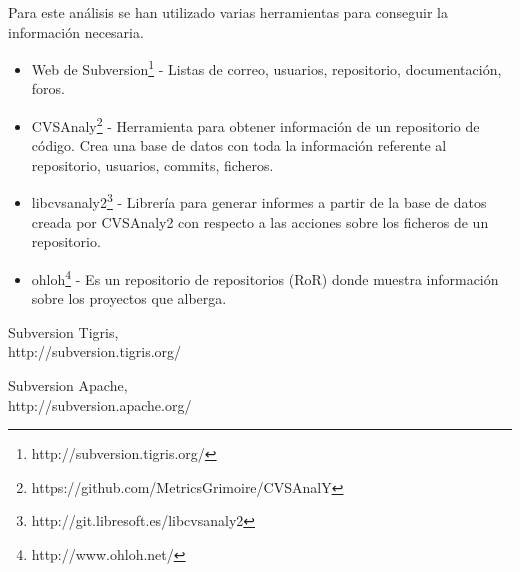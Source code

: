 \documentclass[11pt]{scrartcl}
\begin{document}
\par Para este an\'alisis se han utilizado varias herramientas para conseguir la informaci\'on necesaria.

\begin{itemize}
    \item Web de Subversion\footnote{http://subversion.tigris.org/} - Listas de correo, usuarios, repositorio, documentaci\'on, foros.
    \item CVSAnaly\footnote{https://github.com/MetricsGrimoire/CVSAnalY} - Herramienta para obtener informaci\'on de un repositorio de c\'odigo. Crea una base de datos con toda la informaci\'on referente al repositorio, usuarios, commits, ficheros.
    \item libcvsanaly2\footnote{http://git.libresoft.es/libcvsanaly2} - Librer\'ia para generar informes a partir de la base de datos creada por CVSAnaly2 con respecto a las acciones sobre los ficheros de un repositorio.
    \item ohloh\footnote{http://www.ohloh.net/} - Es un repositorio de repositorios (RoR) donde muestra informaci\'on sobre los proyectos que alberga.

\end{itemize}

\begin{thebibliography}{9}

  Subversion Tigris,\\
  http://subversion.tigris.org/

  Subversion Apache,\\
  http://subversion.apache.org/

\end{thebibliography}
\end{document}
